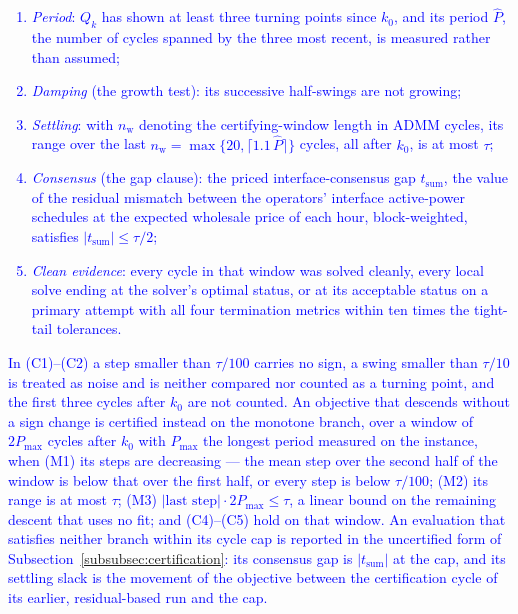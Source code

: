\documentclass[preprint,12pt]{elsarticle}
\begin{document}
\textcolor{blue}{
    \begin{enumerate}
        \item[(C1)] \emph{Period}: $Q_k$ has shown at least three turning points since $k_0$, and its period $\hat{P}$, the number of cycles spanned by the three most recent, is measured rather than assumed;
        \item[(C2)] \emph{Damping} (the growth test): its successive half-swings are not growing;
        \item[(C3)] \emph{Settling}: with $n_{\mathrm{w}}$ denoting the certifying-window length in ADMM cycles, its range over the last $n_{\mathrm{w}} = \max\{20, \lceil 1.1\,\hat{P} \rceil\}$ cycles, all after $k_0$, is at most $\tau$;
        \item[(C4)] \emph{Consensus} (the gap clause): the priced interface-consensus gap $t_{\text{sum}}$, the value of the residual mismatch between the operators' interface active-power schedules at the expected wholesale price of each hour, block-weighted, satisfies $|t_{\text{sum}}| \le \tau/2$;
        \item[(C5)] \emph{Clean evidence}: every cycle in that window was solved cleanly, every local solve ending at the solver's optimal status, or at its acceptable status on a primary attempt with all four termination metrics within ten times the tight-tail tolerances.
    \end{enumerate}
}

\textcolor{blue}{
    In (C1)--(C2) a step smaller than $\tau/100$ carries no sign, a swing smaller than $\tau/10$ is treated as noise and is neither compared nor counted as a turning point, and the first three cycles after $k_0$ are not counted. An objective that descends without a sign change is certified instead on the monotone branch, over a window of $2P_{\max}$ cycles after $k_0$ with $P_{\max}$ the longest period measured on the instance, when (M1) its steps are decreasing --- the mean step over the second half of the window is below that over the first half, or every step is below $\tau/100$; (M2) its range is at most $\tau$; (M3) $|\text{last step}| \cdot 2P_{\max} \le \tau$, a linear bound on the remaining descent that uses no fit; and (C4)--(C5) hold on that window. An evaluation that satisfies neither branch within its cycle cap is reported in the uncertified form of Subsection~\ref{subsubsec:certification}: its consensus gap is $|t_{\text{sum}}|$ at the cap, and its settling slack is the movement of the objective between the certification cycle of its earlier, residual-based run and the cap.
}
\end{document}
